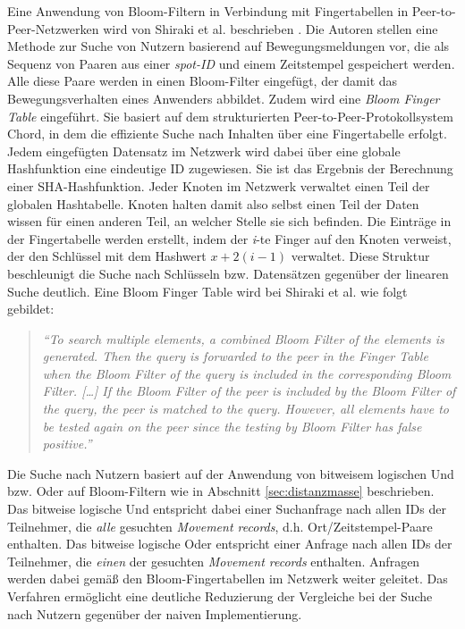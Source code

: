 Eine Anwendung von Bloom-Filtern in Verbindung mit Fingertabellen in Peer-to-Peer-Netzwerken wird von Shiraki et al. beschrieben \cite{Shiraki2009}. Die Autoren stellen eine Methode zur Suche von Nutzern basierend auf Bewegungsmeldungen vor, die als Sequenz von Paaren aus einer \textit{spot-ID} und einem Zeitstempel gespeichert werden. Alle diese Paare werden in einen Bloom-Filter eingefügt, der damit das Bewegungsverhalten eines Anwenders abbildet. Zudem wird eine \textit{Bloom Finger Table} eingeführt. Sie basiert auf dem strukturierten Peer-to-Peer-Protokollsystem Chord, in dem die effiziente Suche nach Inhalten über eine Fingertabelle erfolgt. Jedem eingefügten Datensatz im Netzwerk wird dabei über eine globale Hashfunktion eine eindeutige ID zugewiesen. Sie ist das Ergebnis der Berechnung einer SHA-Hashfunktion. Jeder Knoten im Netzwerk verwaltet einen Teil der globalen Hashtabelle. Knoten halten damit also selbst einen Teil der Daten wissen für einen anderen Teil, an welcher Stelle sie sich befinden. Die Einträge in der Fingertabelle werden erstellt, indem der \textit{i}-te Finger auf den Knoten verweist, der den Schlüssel mit dem Hashwert $x+2(i-1)$ verwaltet. Diese Struktur beschleunigt die Suche nach Schlüsseln bzw. Datensätzen gegenüber der linearen Suche deutlich. Eine Bloom Finger Table wird bei Shiraki et al. wie folgt gebildet: 
\begin{quote}
\textit{"`To search multiple elements, a combined Bloom Filter of the elements is generated. Then the query is forwarded to the peer in the Finger Table when the Bloom Filter of the query is included in the corresponding Bloom Filter. [\dots] If the Bloom Filter of the peer is included by the Bloom Filter of the query, the peer is matched to the query. However, all elements have to be tested again on the peer since the testing by Bloom Filter has false positive."' }\cite{Shiraki2009}
\end{quote}
Die Suche nach Nutzern basiert auf der Anwendung von bitweisem logischen Und bzw. Oder auf Bloom-Filtern wie in Abschnitt \ref{sec:distanzmasse} beschrieben. Das bitweise logische Und entspricht dabei einer Suchanfrage nach allen IDs der Teilnehmer, die \textit{alle} gesuchten \textit{Movement records}, d.h. Ort/Zeitstempel-Paare enthalten. Das bitweise logische Oder entspricht einer Anfrage nach allen IDs der Teilnehmer, die \textit{einen} der gesuchten \textit{Movement records} enthalten. Anfragen werden dabei gemäß den Bloom-Fingertabellen im Netzwerk weiter geleitet. Das Verfahren ermöglicht eine deutliche Reduzierung der Vergleiche bei der Suche nach Nutzern gegenüber der naiven Implementierung. 

